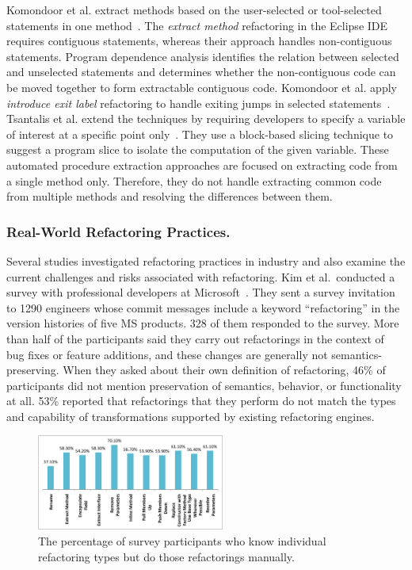 Komondoor et al.\/ extract methods based on the user-selected or tool-selected statements in one method~\cite{Komondoor2000, Komondoor2003}. The {\em extract method} refactoring in the Eclipse IDE requires contiguous statements, whereas their approach handles non-contiguous statements. Program dependence analysis identifies the relation between selected and unselected statements and determines whether the non-contiguous code can be moved together to form extractable contiguous code. Komondoor et al.\/ apply {\em introduce exit label} refactoring to handle exiting jumps in selected statements~\cite{Komondoor2003}. Tsantalis et al.\/ extend the techniques by requiring developers to specify a variable of interest at a specific point only~\cite{tsantalis2011identification}. They use a block-based slicing technique to suggest a program slice to isolate the computation of the given variable. These automated procedure extraction approaches are focused on extracting code from a single method only. Therefore, they do not handle extracting common code from multiple methods and resolving the differences between them. 

\subsubsection{Real-World Refactoring Practices.} 
\label{sec:refactoringpractice} 

Several studies investigated refactoring practices in industry and also examine the current challenges and risks associated with refactoring. Kim et al.~conducted a survey with professional developers at Microsoft~\cite{Kim2012:FSR, Kim2014:EmpiricalStudy}. They sent a survey invitation to 1290 engineers whose commit messages include a keyword ``refactoring'' in the version histories of five MS products. 328 of them responded to the survey. More than half of the participants said they carry out refactorings in the context of bug fixes or feature additions, and these changes are generally not semantics-preserving. When they asked about their own definition of refactoring, 46\% of participants did not mention preservation of semantics, behavior, or functionality at all. 53\% reported that refactorings that they perform do not match the types and capability of transformations supported by existing refactoring engines. 

\begin{figure}[!htb]
\centering
    \includegraphics[width=0.55\textwidth]{images/manualRefactoring.pdf}
    \caption{The percentage of survey participants who know individual refactoring types but do those refactorings manually.\cite{Kim2014:EmpiricalStudy}}  
\label{fig:manualRefactoring} 
\end{figure} 

